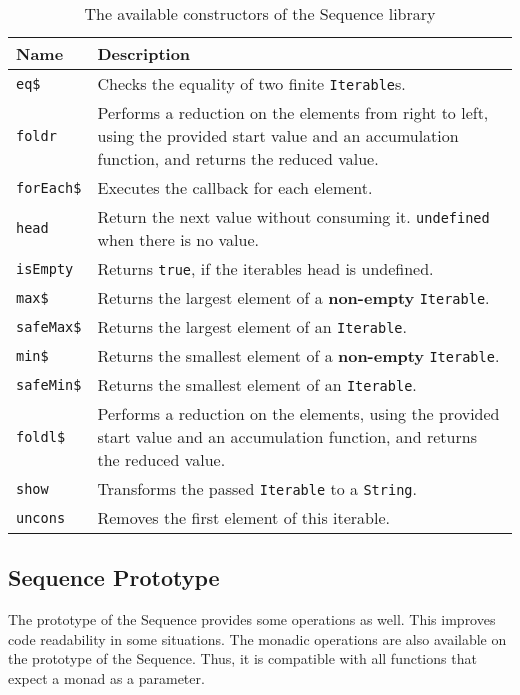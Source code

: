 \begin{table}[H]
  \centering
  \begin{tabularx}{\textwidth}{| l | X |} \hline
    \textbf{Name} & \textbf{Description} \\ \hline
    \texttt{eq\$} & Checks the equality of two finite \texttt{Iterable}s. \\ \hline 
    \texttt{foldr} & Performs a reduction on the elements from right to left, using the provided start value and an accumulation function, and returns the reduced value. \\ \hline 
    \texttt{forEach\$} & Executes the callback for each element. \\ \hline 
    \texttt{head} & Return the next value without consuming it. \texttt{undefined} when there is no value. \\ \hline 
    \texttt{isEmpty} & Returns \texttt{true}, if the iterables head is undefined. \\ \hline 
    \texttt{max\$} & Returns the largest element of a \textbf{non-empty} \texttt{Iterable}. \\ \hline 
    \texttt{safeMax\$} & Returns the largest element of an \texttt{Iterable}. \\ \hline 
    \texttt{min\$} & Returns the smallest element of a \textbf{non-empty} \texttt{Iterable}. \\ \hline 
    \texttt{safeMin\$} & Returns the smallest element of an \texttt{Iterable}. \\ \hline 
    \texttt{foldl\$} & Performs a reduction on the elements, using the provided start value and an accumulation function, and returns the reduced value. \\ \hline 
    \texttt{show} & Transforms the passed \texttt{Iterable} to a \texttt{String}. \\ \hline 
    \texttt{uncons} & Removes the first element of this iterable. \\ \hline 
  \end{tabularx}
  \caption{The available constructors of the Sequence library}
  \label{tab:api_term_ops}
\end{table}

\subsection{Sequence Prototype} %
\label{sub:Sequence Prototype}
The prototype of the Sequence provides some operations as well. This improves
code readability in some situations. The monadic operations are also available
on the prototype of the Sequence. Thus, it is compatible with all functions
that expect a monad as a parameter.

